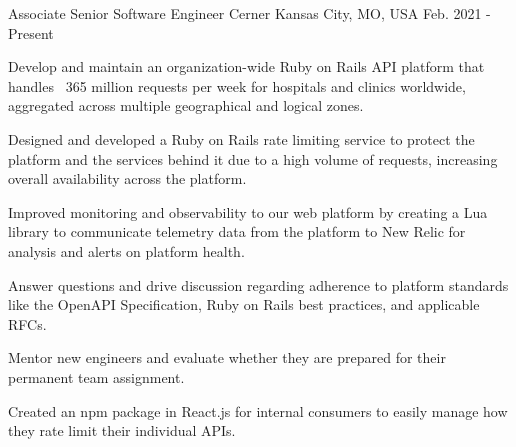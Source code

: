 

\begin{cventries}

  \cventry
    {Associate Senior Software Engineer} %
    {Cerner} %
    {Kansas City, MO, USA} %
    {Feb. 2021 - Present} %
    {
      \begin{cvitems} %
        \item {Develop and maintain an organization-wide Ruby on Rails API platform that handles ~365 million requests per week for hospitals and clinics worldwide, aggregated across multiple geographical and logical zones.}
        \item {Designed and developed a Ruby on Rails rate limiting service to protect the platform and the services behind it due to a high volume of requests, increasing overall availability across the platform.}
        \item {Improved monitoring and observability to our web platform by creating a Lua library to communicate telemetry data from the platform to New Relic for analysis and alerts on platform health.}
        \item {Answer questions and drive discussion regarding adherence to platform standards like the OpenAPI Specification, Ruby on Rails best practices, and applicable RFCs.}
        \item {Mentor new engineers and evaluate whether they are prepared for their permanent team assignment.}
        \item {Created an npm package in React.js for internal consumers to easily manage how they rate limit their individual APIs.}
      \end{cvitems}
    }


\end{cventries}
